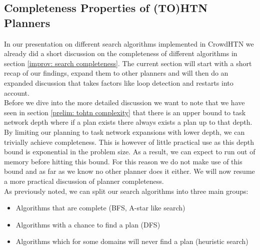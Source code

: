 \subsection{Completeness Properties of (TO)HTN Planners}
In our presentation on different search algorithms implemented in CrowdHTN we already did a short discussion on the completeness of different algorithms in section \ref{improv: search completeness}. The current section will start with a short recap of our findings, expand them to other planners and will then do an expanded discussion that takes factors like loop detection and restarts into account. \\
Before we dive into the more detailed discussion we want to note that we have seen in section \ref{prelim: tohtn complexity} that there is an upper bound to task network depth where if a plan exists there always exists a plan up to that depth. By limiting our planning to task network expansions with lower depth, we can trivially achieve completeness. This is however of little practical use as this depth bound is exponential in the problem size. As a result, we can expect to run out of memory before hitting this bound. For this reason we do not make use of this bound and as far as we know no other planner does it either. We will now resume a more practical discussion of planner completeness.\\ 
As previously noted, we can split our search algorithms into three main groups:
\begin{itemize}
	\item Algorithms that are complete (BFS, A-star like search)
	\item Algorithms with a chance to find a plan (DFS)
	\item Algorithms which for some domains will never find a plan (heuristic search)
\end{itemize}
